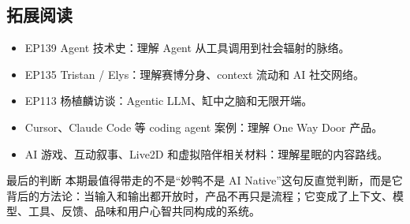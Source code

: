 \subsection{拓展阅读}

\begin{itemize}
\item EP139 Agent 技术史：理解 Agent 从工具调用到社会辐射的脉络。
\item EP135 Tristan / Elys：理解赛博分身、context 流动和 AI 社交网络。
\item EP113 杨植麟访谈：Agentic LLM、缸中之脑和无限开端。
\item Cursor、Claude Code 等 coding agent 案例：理解 One Way Door 产品。
\item AI 游戏、互动叙事、Live2D 和虚拟陪伴相关材料：理解星眠的内容路线。
\end{itemize}

\begin{importantbox}{最后的判断}
本期最值得带走的不是“妙鸭不是 AI Native”这句反直觉判断，而是它背后的方法论：当输入和输出都开放时，产品不再只是流程；它变成了上下文、模型、工具、反馈、品味和用户心智共同构成的系统。
\end{importantbox}


